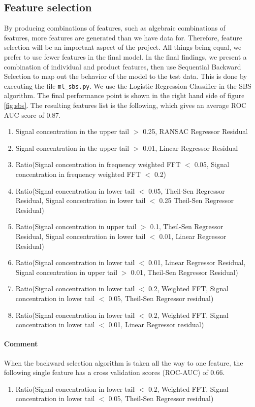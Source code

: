 \documentclass[12pt]{article}
\begin{document}
\subsection{Feature selection}
By producing combinations of features, such as algebraic combinations of features, more features are generated than we have data for. Therefore, feature selection will be an important aspect of the project. All things being equal, we prefer to use fewer features in the final model. In the final findings, we present a combination of individual and product features, then use Sequential Backward Selection to map out the behavior of the model to the test data. This is done by executing the file \verb|ml_sbs.py|. We use the Logistic Regression Classifier in the SBS algorithm. The final performance point is shown in the right hand side of figure \ref{fig:sbs}. 
The resulting features list is the following, which gives an average ROC AUC score of 0.87.
\begin{enumerate}
\item{Signal concentration in the upper tail $>$ 0.25, RANSAC Regressor Residual}
\item{Signal concentration in the upper tail $>$ 0.01, Linear Regressor Residual}
\item{Ratio(Signal concentration in frequency weighted FFT $<$ 0.05, Signal concentration in frequency weighted FFT $<$ 0.2)}
\item{Ratio(Signal concentration in lower tail $<$ 0.05, Theil-Sen Regressor Residual, Signal concentration in lower tail $<$ 0.25 Theil-Sen Regressor Residual)}
\item{Ratio(Signal concentration in upper tail $>$ 0.1, Theil-Sen Regressor Residual, Signal concentration in lower tail $<$ 0.01, Linear Regressor Residual)}
\item{Ratio(Signal concentration in lower tail $<$ 0.01, Linear Regressor Residual, Signal concentration in upper tail $>$ 0.01, Theil-Sen Regressor Residual)}
\item{Ratio(Signal concentration in lower tail $<$ 0.2, Weighted FFT, Signal concentration in lower tail $<$ 0.05, Theil-Sen Regressor residual)}
\item{Ratio(Signal concentration in lower tail $<$ 0.2, Weighted FFT, Signal concentration in lower tail $<$ 0.01, Linear Regressor residual)}
\end{enumerate}

\paragraph{Comment} When the backward selection algorithm is taken all the way to one feature, the following single feature has a cross validation scores (ROC-AUC) of 0.66. 
\begin{enumerate}
\item{Ratio(Signal concentration in lower tail $<$ 0.2, Weighted FFT, Signal concentration in lower tail $<$ 0.05, Theil-Sen Regressor residual)}
\end{enumerate}
\end{document}
